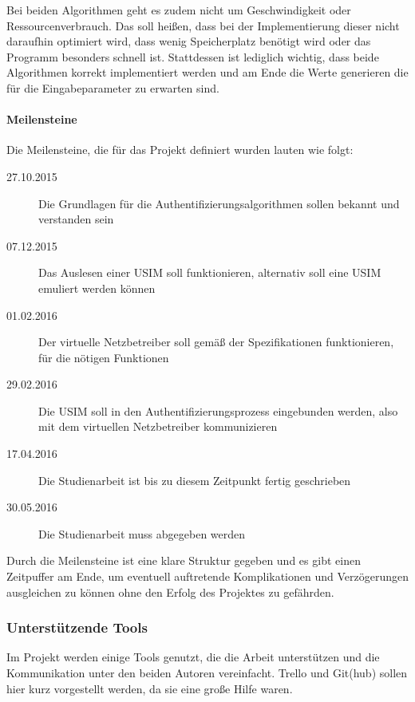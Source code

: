  Bei beiden Algorithmen geht es zudem nicht um Geschwindigkeit oder Ressourcenverbrauch.
 Das soll heißen, dass bei der Implementierung dieser nicht daraufhin optimiert wird, dass wenig
 Speicherplatz benötigt wird oder das Programm besonders schnell ist. Stattdessen ist lediglich
 wichtig, dass beide Algorithmen korrekt implementiert werden und am Ende die Werte generieren
 die für die Eingabeparameter zu erwarten sind.
 
 \paragraph{Meilensteine} Die Meilensteine, die für das Projekt definiert wurden lauten wie folgt:
 \begin{description}
 \item [27.10.2015] Die Grundlagen für die Authentifizierungs\-algorithmen sollen bekannt und verstanden sein
 \item [07.12.2015] Das Auslesen einer USIM soll funktionieren, alternativ soll eine USIM emuliert werden können
 \item [01.02.2016] Der virtuelle Netzbetreiber soll gemäß der Spezifikationen funktionieren, für die nötigen Funktionen
 \item [29.02.2016] Die USIM soll in den Authentifizierungsprozess eingebunden werden, also mit dem virtuellen Netzbetreiber kommunizieren
 \item [17.04.2016] Die Studienarbeit ist bis zu diesem Zeitpunkt fertig geschrieben
 \item [30.05.2016] Die Studienarbeit muss abgegeben werden
 \end{description}
 
 Durch die Meilensteine ist eine klare Struktur gegeben und es gibt einen Zeitpuffer am Ende,
 um eventuell auftretende Komplikationen und Verzögerungen ausgleichen zu können ohne den
 Erfolg des Projektes zu gefährden.

 \subsubsection{Unterstützende Tools}
  Im Projekt werden einige Tools genutzt, die die Arbeit unterstützen und die Kommunikation
  unter den beiden Autoren vereinfacht. Trello und Git(hub) sollen hier kurz vorgestellt werden,
  da sie eine große Hilfe waren.

